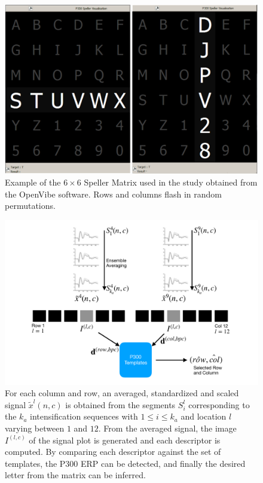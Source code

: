 \documentclass[utf8]{frontiersSCNS} %
\begin{document}
\begin{figure}[h!]
\centering
\includegraphics[width=15cm]{openvibep300matrix.png}
\caption{Example of the $6 \times 6$ Speller Matrix used in the study obtained from the OpenVibe software.  Rows and columns flash in random permutations.}
\label{fig:p300matrix}
\end{figure}

\begin{figure}[h!]
\centering
\includegraphics[width=15cm]{classificationgraph.pdf}
\caption{For each column and row, an averaged, standardized and scaled signal $\tilde{x}^l(n,c)$ is obtained from the segments $S_i^l$  corresponding to the $k_a$ intensification sequences with $ 1 \leq i \leq k_a $ and location $l$ varying between $1$ and $12$. From the averaged signal, the image $I^{(l,c)}$ of the signal plot is generated and each descriptor is computed.  By comparing each descriptor against the set of templates, the P300 ERP can be detected, and finally the desired letter from the matrix can be inferred.}
\label{fig:classification}
\end{figure}
\end{document}
